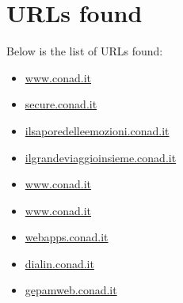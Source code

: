 \documentclass{article}
\begin{document}
\section*{URLs found}

Below is the list of URLs found:

\begin{itemize}
    
        
        
        \item \href{ https://www.conad.it/contenuti/landing\_CIA/CIA\_promo\_locale\_50\_settembre.html?utm\_source=crm\&utm\_medium=push\&utm\_campaign=cia\_2021\_SottoscrizioneCC\_Set\_02 }{ www.conad.it }
    
        
        
        \item \href{ http://secure.conad.it/ }{ secure.conad.it }
    
        
        
        \item \href{ http://ilsaporedelleemozioni.conad.it/ }{ ilsaporedelleemozioni.conad.it }
    
        
        
        \item \href{ https://ilgrandeviaggioinsieme.conad.it/ }{ ilgrandeviaggioinsieme.conad.it }
    
        
        
        \item \href{ https://www.conad.it/esperienze-di-gusto.html }{ www.conad.it }
    
        
        
        \item \href{ https://www.conad.it/ricerca-negozi?utm\_source=crm\&utm\_medium=email\&utm\_content=124647515\&utm\_campaign=\_ }{ www.conad.it }
    
        
        
        \item \href{ http://webapps.conad.it }{ webapps.conad.it }
    
        
        
        \item \href{ https://dialin.conad.it/ }{ dialin.conad.it }
    
        
        
        \item \href{ http://gepamweb.conad.it }{ gepamweb.conad.it }
    
        
        

\end{itemize}
\end{document}
